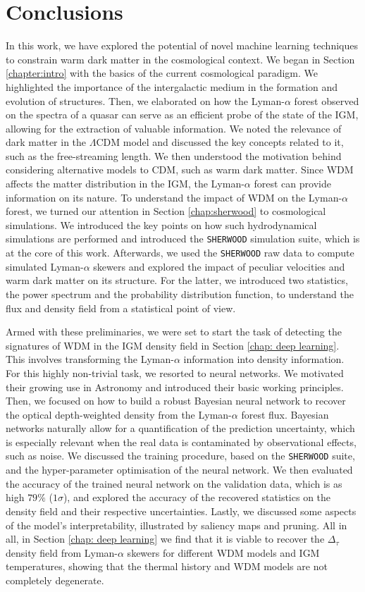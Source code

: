 \chapter{Conclusions}
In this work, we have explored the potential of novel machine learning techniques to constrain warm dark matter in the cosmological context. We began in Section \ref{chapter:intro} with the basics of the current cosmological paradigm. We highlighted the importance of the intergalactic medium in the formation and evolution of structures. Then, we elaborated on how the Lyman-$\alpha$ forest observed on the spectra of a quasar can serve as an efficient probe of the state of the IGM, allowing for the extraction of valuable information. We noted the relevance of dark matter in the $\Lambda$CDM model and discussed the key concepts related to it, such as the free-streaming length. We then understood the motivation behind considering alternative models to CDM, such as warm dark matter. Since WDM affects the matter distribution in the IGM, the Lyman-$\alpha$ forest can provide information on its nature. To understand the impact of WDM on the Lyman-$\alpha$ forest, we turned our attention in Section \ref{chap:sherwood} to cosmological simulations. We introduced the key points on how such hydrodynamical simulations are performed and introduced the \texttt{SHERWOOD} simulation suite, which is at the core of this work. Afterwards, we used the \texttt{SHERWOOD} raw data to compute simulated Lyman-$\alpha$ skewers and explored the impact of peculiar velocities and warm dark matter on its structure. For the latter, we introduced two statistics, the power spectrum and the probability distribution function, to understand the flux and density field from a statistical point of view.

Armed with these preliminaries, we were set to start the task of detecting the signatures of WDM in the IGM density field in Section \ref{chap: deep learning}. This involves transforming the Lyman-$\alpha$ information into density information. For this highly non-trivial task, we resorted to neural networks. We motivated their growing use in Astronomy and introduced their basic working principles. Then, we focused on how to build a robust Bayesian neural network to recover the optical depth-weighted density from the Lyman-$\alpha$ forest flux. Bayesian networks naturally allow for a quantification of the prediction uncertainty, which is especially relevant when the real data is contaminated by observational effects, such as noise. We discussed the training procedure, based on the \texttt{SHERWOOD} suite, and the hyper-parameter optimisation of the neural network. We then evaluated the accuracy of the trained neural network on the validation data, which is as high $79 \%$ ($1\sigma$), and explored the accuracy of the recovered statistics on the density field and their respective uncertainties. Lastly, we discussed some aspects of the model's interpretability, illustrated by saliency maps and pruning. All in all, in Section \ref{chap: deep learning} we find that it is viable to recover the $\Delta_\tau$ density field from Lyman-$\alpha$ skewers for different WDM models and IGM temperatures, showing that the thermal history and WDM models are not completely degenerate.

